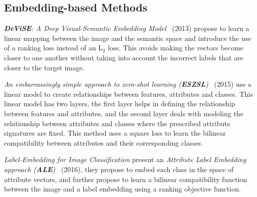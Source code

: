 \subsection{Embedding-based Methods}

\textit{\textbf{DeViSE}: A Deep Visual-Semantic Embedding Model}~\cite{DeViSE} (2013) propose to learn a linear mapping between the image and the semantic space and introduce the use of a ranking loss instead of an L$_2$ loss. This avoids making the vectors become closer to one another without taking into account the incorrect labels that are closer to the target image.

\textit{An embarrassingly simple approach to zero-shot learning (\textbf{ESZSL})}~\cite{ESZSL} (2015) use a linear model to create relationships between features, attributes and classes. This linear model has two layers, the first layer  helps in defining the relationship between features and attributes, and the second layer deals with modeling the relationship between attributes and classes where the prescribed attribute signatures are fixed. This method uses a square loss to learn the bilinear compatibility between attributes and their corresponding classes. 

\textit{Label-Embedding for Image Classification} present an \textit{Attribute Label Embedding approach (\textbf{ALE})}~\cite{ALE} (2016), they propose to embed each class in the space of attribute vectors, and further propose to learn a bilinear compatibility function between the image and a label embedding using a ranking objective function. 








 

